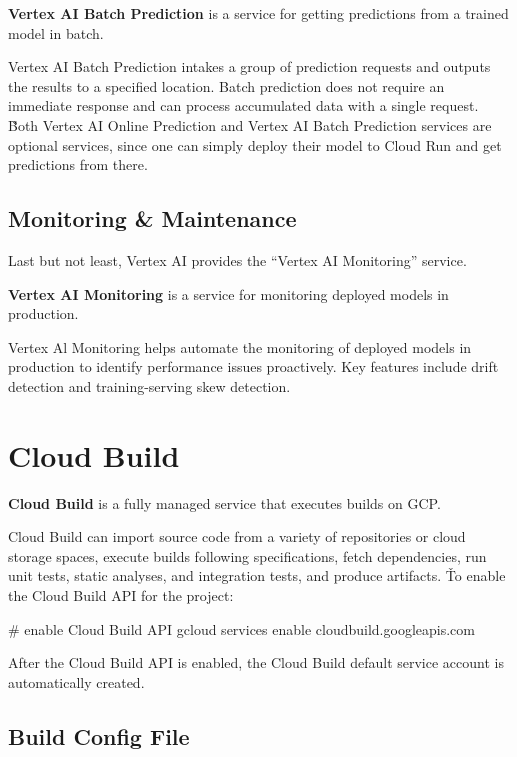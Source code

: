 \textbf{Vertex AI Batch Prediction} is a service for getting predictions from a trained model in batch.
\ed

Vertex AI Batch Prediction intakes a group of prediction requests and outputs the results to a specified location. Batch
prediction does not require an immediate response and can process accumulated data with a single request. \v

Both Vertex AI Online Prediction and Vertex AI Batch Prediction services are optional services, since one can simply
deploy their model to Cloud Run and get predictions from there.

\subsection{Monitoring \& Maintenance}

Last but not least, Vertex AI provides the ``Vertex AI Monitoring'' service.

\textbf{Vertex AI Monitoring} is a service for monitoring deployed models in production.
\ed

Vertex Al Monitoring helps automate the monitoring of deployed models in production to identify performance issues
proactively. Key features include drift detection and training-serving skew detection.

\section{Cloud Build}\label{sec:cloud_build}

\textbf{Cloud Build} is a fully managed service that executes builds on GCP\@.
\ed

Cloud Build can import source code from a variety of repositories or cloud storage spaces, execute builds following
specifications, fetch dependencies, run unit tests, static analyses, and integration tests, and produce artifacts. \v

To enable the Cloud Build API for the project:
\begin{bash}
# enable Cloud Build API
gcloud services enable cloudbuild.googleapis.com
\end{bash}

After the Cloud Build API is enabled, the Cloud Build default service account is automatically created.

\subsection{Build Config File}

